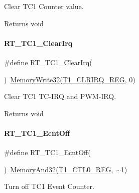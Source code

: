 Clear T\+C1 Counter value. 

\begin{DoxyReturn}{Returns}
void 
\end{DoxyReturn}
\mbox{\label{a00044_ab9c21242bf3ba2144aa45a336a4dc7ea}} 
\paragraph{\texorpdfstring{R\+T\+\_\+\+T\+C1\+\_\+\+Clear\+Irq}{RT\_TC1\_ClearIrq}}
{\footnotesize\ttfamily \#define R\+T\+\_\+\+T\+C1\+\_\+\+Clear\+Irq(\begin{DoxyParamCaption}{ }\end{DoxyParamCaption})~\mbox{\hyperlink{a00020_a6b9732365b12e48ddb89fe1028b975b0}{Memory\+Write32}}(\mbox{\hyperlink{a00020_adadaa0ab1ebbd7ba9b70dfd24c3ed44daf10911af3fb19f6d248097500d6ab3cd}{T1\+\_\+\+C\+L\+R\+I\+R\+Q\+\_\+\+R\+EG}}, 0)}



Clear T\+C1 T\+C-\/\+I\+RQ and P\+W\+M-\/\+I\+RQ. 

\begin{DoxyReturn}{Returns}
void 
\end{DoxyReturn}
\mbox{\label{a00044_a1c9b9839a03d3e9b1158a2be2feebf42}} 
\paragraph{\texorpdfstring{R\+T\+\_\+\+T\+C1\+\_\+\+Ecnt\+Off}{RT\_TC1\_EcntOff}}
{\footnotesize\ttfamily \#define R\+T\+\_\+\+T\+C1\+\_\+\+Ecnt\+Off(\begin{DoxyParamCaption}{ }\end{DoxyParamCaption})~\mbox{\hyperlink{a00020_ad87cedffcaadc51db22594fce55173d4}{Memory\+And32}}(\mbox{\hyperlink{a00020_adadaa0ab1ebbd7ba9b70dfd24c3ed44da38632250c2e72df96fcaa3f8bd8ecc5e}{T1\+\_\+\+C\+T\+L0\+\_\+\+R\+EG}}, $\sim$1)}



Turn off T\+C1 Event Counter. 

